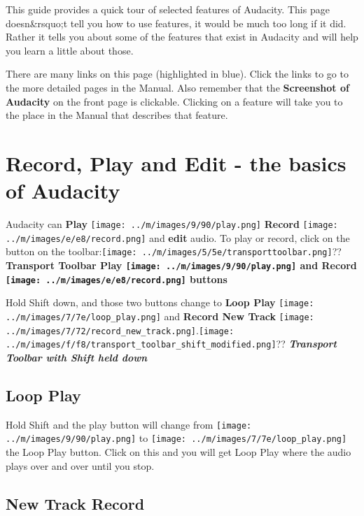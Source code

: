\documentclass[twocolumn]{book}
\begin{document}
This guide provides a quick tour of selected features of Audacity.  This page doesn\&rsquo;t tell you how to use features, it would be much too long if it did.  Rather it tells you about some of the features that exist in Audacity and will help you learn a little about those.

There are many links on this page (highlighted in blue). Click the links to go to the more detailed pages in the Manual. 
Also remember that the \textbf{Screenshot of Audacity} on the front page is clickable.  Clicking on a feature will take you to the place in the Manual that describes that feature. 



\section{Record, Play and Edit - the basics of Audacity}


Audacity can \textbf{Play} \texttt{[image: ../m/images/9/90/play.png]} \textbf{Record} \texttt{[image: ../m/images/e/e8/record.png]} and  \textbf{edit} audio.  To play or record, click on the button on the toolbar:\texttt{[image: ../m/images/5/5e/transporttoolbar.png]}??
\textbf{Transport Toolbar Play \texttt{[image: ../m/images/9/90/play.png]} and Record \texttt{[image: ../m/images/e/e8/record.png]} buttons}


Hold Shift down, and those two buttons change to \textbf{Loop Play} \texttt{[image: ../m/images/7/7e/loop\_play.png]} and \textbf{Record New Track} \texttt{[image: ../m/images/7/72/record\_new\_track.png]}.\texttt{[image: ../m/images/f/f8/transport\_toolbar\_shift\_modified.png]}??
\textit{\textbf{Transport Toolbar with Shift held down}}

\subsection{Loop Play}


Hold Shift and the play button will change from \texttt{[image: ../m/images/9/90/play.png]} to \texttt{[image: ../m/images/7/7e/loop\_play.png]} the Loop Play button. Click on this and you will get Loop Play where the audio plays over and over until you stop.  

\subsection{New Track Record}
\end{document}
